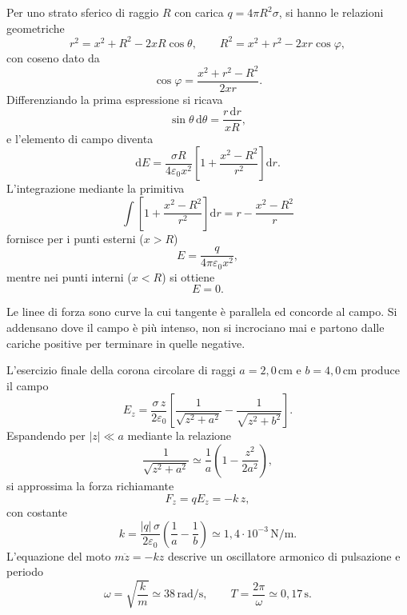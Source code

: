 \documentclass[11pt,a4paper]{article}
\newcommand{\dd}{\mathrm{d}}
\newcommand{\epz}{\varepsilon_0}
\begin{document}
Per uno strato sferico di raggio $R$ con carica $q=4\pi R^2\sigma$, si hanno le relazioni geometriche
\[
r^2=x^2+R^2-2xR\cos\theta, \qquad R^2=x^2+r^2-2xr\cos\varphi,
\]
con coseno dato da
\[
\cos\varphi=\frac{x^2+r^2-R^2}{2xr}.
\]
Differenziando la prima espressione si ricava
\[
\sin\theta\,\dd\theta=\frac{r\,\dd r}{xR},
\]
e l'elemento di campo diventa
\[
\dd E=\frac{\sigma R}{4\epz x^2}\left[1+\frac{x^2-R^2}{r^2}\right]\dd r .
\]
L'integrazione mediante la primitiva
\[
\int\left[1+\frac{x^2-R^2}{r^2}\right]\dd r = r - \frac{x^2-R^2}{r}
\]
fornisce per i punti esterni ($x>R$)
\[
E=\frac{q}{4\pi\epz x^2},
\]
mentre nei punti interni ($x<R$) si ottiene
\[
E=0.
\]

Le linee di forza sono curve la cui tangente è parallela ed concorde al campo. Si addensano dove il campo è più intenso, non si incrociano mai e partono dalle cariche positive per terminare in quelle negative.

L'esercizio finale della corona circolare di raggi $a=2{,}0\,\mathrm{cm}$ e $b=4{,}0\,\mathrm{cm}$ produce il campo
\[
E_z=\frac{\sigma\,z}{2\epz}\left[\frac{1}{\sqrt{z^2+a^2}}-\frac{1}{\sqrt{z^2+b^2}}\right].
\]
Espandendo per $|z|\ll a$ mediante la relazione
\[
\frac{1}{\sqrt{z^2+a^2}}\simeq\frac1a\left(1-\frac{z^2}{2a^2}\right),
\]
si approssima la forza richiamante
\[
F_z=qE_z=-k\,z,
\]
con costante
\[
k=\frac{|q|\,\sigma}{2\epz}\left(\frac1a-\frac1b\right)\simeq 1,4\cdot 10^{-3}\,\mathrm{N/m}.
\]
L'equazione del moto $m\ddot z=-kz$ descrive un oscillatore armonico di pulsazione e periodo
\[
\omega=\sqrt{\frac{k}{m}}\simeq 38\,\mathrm{rad/s},\qquad
T=\frac{2\pi}{\omega}\simeq 0,17\,\mathrm{s}.
\]
\end{document}
